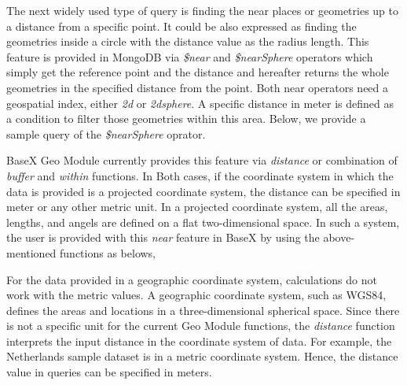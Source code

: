 \documentclass[a4paper,12pt]{article}
\begin{document}
The next widely used type of query is finding the near places or geometries up to a distance from a specific point. It could be also expressed as finding the geometries inside a circle with the distance value as the radius length. This feature is provided in MongoDB via \textit{\$near} and \textit{\$nearSphere} operators which simply get the reference point and the distance and hereafter returns the whole geometries in the specified distance from the point. Both near operators need a geospatial index, either \textit{2d} or \textit{2dsphere}. A specific distance in meter is defined as a condition to filter those geometries within this area. Below, we provide a sample query of the \textit{\$nearSphere} oprator.  
\vspace{10px}
\vspace{10px}
BaseX Geo Module currently provides this feature via \textit{distance} or combination of \textit{buffer} and \textit{within} functions. In Both cases, if the coordinate system in which the data is provided is a projected coordinate system, the distance can be specified in meter or any other metric unit. In a projected coordinate system, all the areas, lengths, and angels are defined on a flat two-dimensional space. In such a system, the user is provided with this \textit{near} feature in BaseX by using the above-mentioned functions as belows,
\vspace{10px}
\vspace{10px}


For the data provided in a geographic coordinate system, calculations do not work with the metric values. A geographic coordinate system, such as WGS84, defines the areas and locations in a three-dimensional spherical space. Since there is not a specific unit for the current Geo Module functions, the \textit{distance} function interprets the input distance in the coordinate system of data. For example, the Netherlands sample dataset is in a metric coordinate system. Hence, the distance value in queries can be specified in meters. %
\end{document}
